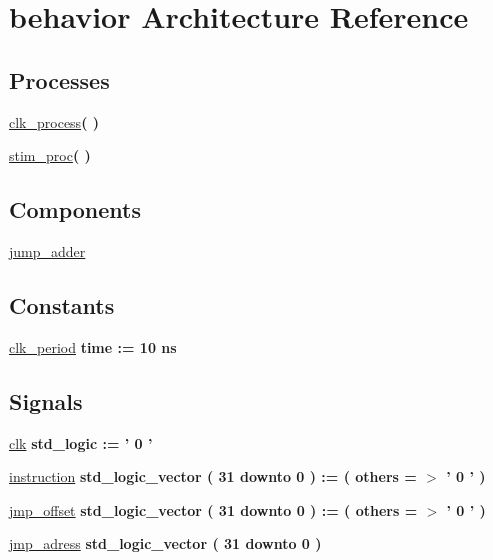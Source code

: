 \hypertarget{classjump__adder__tb_1_1behavior}{\section{behavior \-Architecture \-Reference}
\label{classjump__adder__tb_1_1behavior}
}
\*
\*
\subsection*{\-Processes}
 \begin{DoxyCompactItemize}
\item 
\hyperlink{classjump__adder__tb_1_1behavior_ac5bb218131b813f7908ec89476b31fca}{clk\-\_\-process}{\bfseries  (  )}
\item 
\hyperlink{classjump__adder__tb_1_1behavior_ad2efa6785cff833c341e27596b21aeb5}{stim\-\_\-proc}{\bfseries  (  )}
\end{DoxyCompactItemize}
\subsection*{\-Components}
 \begin{DoxyCompactItemize}
\item 
\hyperlink{classjump__adder__tb_1_1behavior_a37126d0718abf44f03b24857c0ce1ea0}{jump\-\_\-adder}  {\bfseries }  
\end{DoxyCompactItemize}
\subsection*{\-Constants}
 \begin{DoxyCompactItemize}
\item 
\hyperlink{classjump__adder__tb_1_1behavior_a3ffd56257467a8089d6f08ff6c8d0755}{clk\-\_\-period} {\bfseries time  \-:=  10  ns } 
\end{DoxyCompactItemize}
\subsection*{\-Signals}
 \begin{DoxyCompactItemize}
\item 
\hyperlink{classjump__adder__tb_1_1behavior_abac182a083cb1fbdec9988ea49b83305}{clk} {\bfseries std\-\_\-logic  \-:= '  0  ' } 
\item 
\hyperlink{classjump__adder__tb_1_1behavior_a6a7e83159e031a9cd68e875f93591ab2}{instruction} {\bfseries std\-\_\-logic\-\_\-vector (   31    downto    0  )  \-:= (  others  = $>$ '  0  '  ) } 
\item 
\hyperlink{classjump__adder__tb_1_1behavior_a00dfa7e780d02a4939d1f6ed4a60541b}{jmp\-\_\-offset} {\bfseries std\-\_\-logic\-\_\-vector (   31    downto    0  )  \-:= (  others  = $>$ '  0  '  ) } 
\item 
\hyperlink{classjump__adder__tb_1_1behavior_afb052939be0f788cfe696c87ec9a06d9}{jmp\-\_\-adress} {\bfseries std\-\_\-logic\-\_\-vector (   31    downto    0  ) } 
\end{DoxyCompactItemize}


